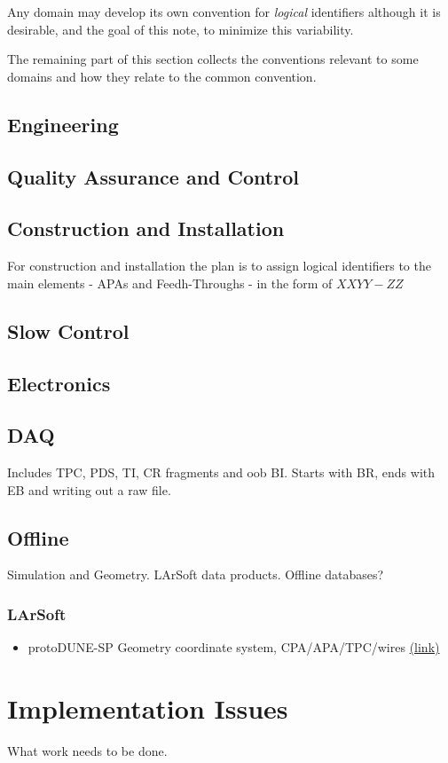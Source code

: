 \documentclass[letterpaper,twoside,onecolumn,report]{memoir}
\begin{document}
Any domain may develop its own convention for \textit{logical}
identifiers although it is desirable, and the goal of this note, to
minimize this variability.

The remaining part of this section collects the conventions relevant
to some domains and how they relate to the common convention.

\subsection{Engineering}
\label{sec:eng}



\subsection{Quality Assurance and Control}
\label{sec:qaqc}

\subsection{Construction and Installation}
\label{sec:inst}

For construction and installation the plan is to assign logical identifiers to the main elements - APAs and Feedh-Throughs - in the form of $XX YY-ZZ$

\subsection{Slow Control}
\label{sec:slow}

\subsection{Electronics}
\label{sec:elec}

\subsection{DAQ}
\label{sec:daq}

Includes TPC, PDS, TI, CR fragments and oob BI.  Starts with BR, ends
with EB and writing out a raw file.

\subsection{Offline}
\label{sec:offline}

Simulation and Geometry.  LArSoft data products.  Offline databases?

\subsubsection{LArSoft}

\begin{itemize}
\item protoDUNE-SP Geometry coordinate system, CPA/APA/TPC/wires \href{https://cdcvs.fnal.gov/redmine/projects/dunetpc/wiki/DUNE_Geometries#ProtoDUNE-SP-Geometry}{(link)}
\end{itemize}

\section{Implementation Issues}
\label{sec:impl}

What work needs to be done.
\end{document}
